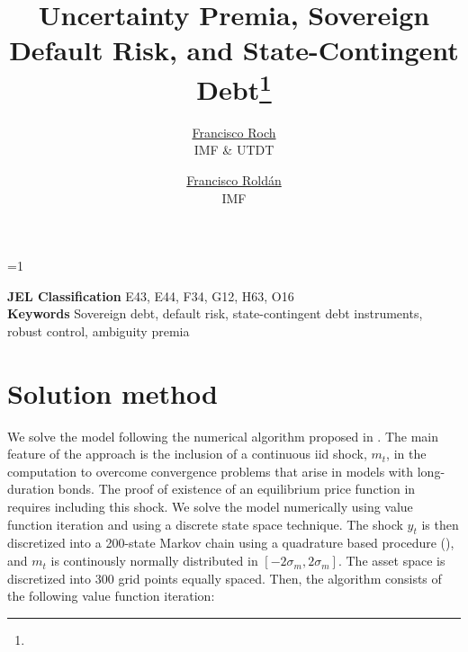 \documentclass[letterpaper,12pt]{article}
\title{Uncertainty Premia, Sovereign Default Risk, and State-Contingent Debt\thanks{\acknotitle}}
\author{
\href{https://sites.google.com/site/franroch/}{\color{mDarkTeal}Francisco Roch}\\{IMF \& UTDT}
\and
\href{https://fqroldan.github.io}{\color{mDarkTeal}Francisco Roldán}\\{ IMF}
}
\date{%
\monthname\xspace \the\year%
}
\def\ungated{1}
\begin{document}
\fontsize{12.0pt}{25.0pt} \selectfont

\ifnum\ungated=1%
  \maketitle
  \begin{abstract}
  \noindent%
  \fontsize{12.0pt}{18.0pt}\selectfont%
  
  \end{abstract}
  \renewcommand{\thefootnote}{\fnsymbol{footnote}} \renewcommand{%
  \thefootnote}{\arabic{footnote}} %
  \thispagestyle{empty} \setcounter{page}{0}
  \fontsize{12.0pt}{25.0pt} \selectfont
  \vfill
  \noindent\textbf{JEL Classification} \quad E43, E44, F34, G12, H63, O16 \\
  \noindent\textbf{Keywords} \quad Sovereign debt, default risk, state-contingent debt instruments, robust control, ambiguity premia
  \vfill
\else
  
  \tableofcontents
\fi


\newpage








\newpage
\linespread{1.0}




\newpage
\appendix{} \newpage {}
\bigskip {}{}

\appendix
\section{Solution method}\label{app:algorithm}

We solve the model following the numerical algorithm proposed in \cite{Chatty}. The main feature of the approach is the inclusion of a continuous iid shock, $m_t$, in the computation to overcome convergence problems that arise in models with long-duration bonds. The proof of existence of an equilibrium price function in \cite{Chatty} requires including this shock. We solve the model numerically using value function iteration and using a discrete state space technique. The shock $y_t$ is then discretized into a 200-state Markov chain using a quadrature based procedure (\citealp{Tauchen}), and $m_t$ is continously normally distributed in $[-2\sigma_m, 2\sigma_m]$. The asset space is discretized into 300 grid points equally spaced. Then, the algorithm consists of the following value function iteration:
\end{document}
